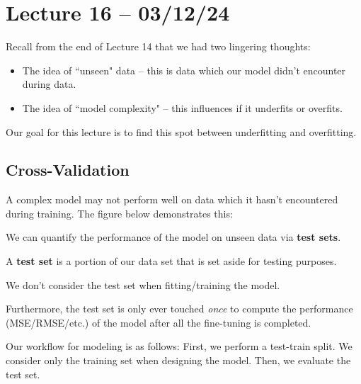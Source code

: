 \documentclass[openany]{book}
\begin{document}
\section{Lecture 16 -- 03/12/24}
Recall from the end of Lecture 14 that we had two lingering thoughts:
\begin{itemize}
	\item The idea of ``unseen" data -- this is data which our model didn't encounter during data.
	\item The idea of ``model complexity" -- this influences if it underfits or overfits.
\end{itemize}

\begin{comment}
\begin{figurebox}[]{Model Complexity versus Error/Variance}
	\centering\texttt{[image: model\_graph]}
\end{figurebox}
\end{comment}

Our goal for this lecture is to find this spot between underfitting and overfitting.
\subsection{Cross-Validation}
A complex model may not perform well on data which it hasn't encountered during training. The figure below demonstrates this:

\begin{comment}
	\begin{figurebox}[]{Complex model on unseen data}
		\centering\texttt{[image: complex\_on\_unseen]}
	\end{figurebox}
\end{comment}

We can quantify the performance of the model on unseen data via \textbf{test sets}.

\begin{defn}
	A \textbf{test set} is a portion of our data set that is set aside for testing purposes.
	
	We don't consider the test set when fitting/training the model.
	
	Furthermore, the test set is only ever touched \textit{once} to compute the performance (MSE/RMSE/etc.) of the model after all the fine-tuning is completed.
\end{defn}

Our workflow for modeling is as follows: First, we perform a test-train split. We consider only the training set when designing the model. Then, we evaluate the test set.
\end{document}
